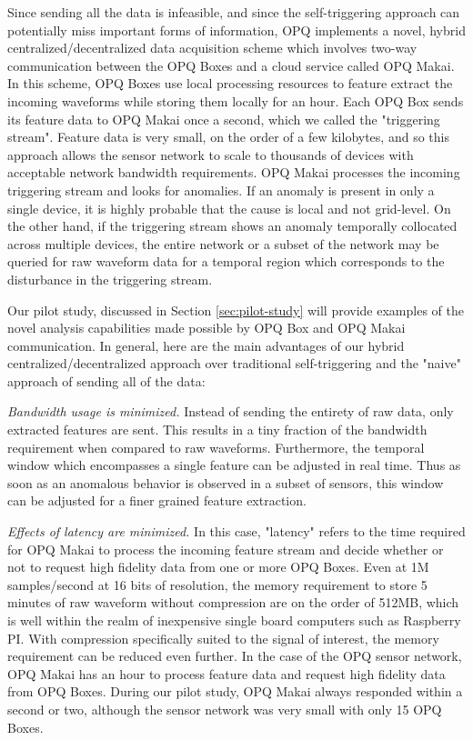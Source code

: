 Since sending all the data is infeasible, and since the self-triggering approach can potentially miss important forms of information, OPQ implements a novel, hybrid centralized/decentralized data acquisition scheme which involves two-way communication between the OPQ Boxes and a cloud service called OPQ Makai. In this scheme, OPQ Boxes use local processing resources to feature extract the incoming waveforms while storing them locally for an hour. Each OPQ Box sends its feature data to OPQ Makai once a second, which we called the "triggering stream". Feature data is very small, on the order of a few kilobytes, and so this approach allows the sensor network to scale to thousands of devices with acceptable network bandwidth requirements.  OPQ Makai processes the incoming triggering stream and looks for anomalies. If an anomaly is present in only a single device, it is highly probable that the cause is local and not grid-level. On the other hand, if the triggering stream shows an anomaly temporally collocated across multiple devices, the entire network or a subset of the network may be queried for raw waveform data for a temporal region which corresponds to the disturbance in the triggering stream.

Our pilot study, discussed in Section \ref{sec:pilot-study} will provide examples of the novel analysis capabilities made possible by OPQ Box and OPQ Makai communication. In general, here are the main advantages of our hybrid centralized/decentralized approach over traditional self-triggering and the "naive" approach of sending all of the data:

{\em Bandwidth usage is minimized.} Instead of sending the entirety of raw data, only extracted features are sent. This results in a tiny fraction of the bandwidth requirement when compared to raw waveforms. Furthermore, the temporal window which encompasses a single feature can be adjusted in real time. Thus as soon as an anomalous behavior is observed in a subset of sensors, this window can be adjusted for a finer grained feature extraction.

{\em Effects of latency are minimized.} In this case, "latency" refers to the time required for OPQ Makai to process the incoming feature stream and decide whether or not to request high fidelity data from one or more OPQ Boxes. Even at 1M samples/second at 16 bits of resolution, the memory requirement to store 5 minutes of raw waveform without compression are on the order of 512MB, which is well within the realm of inexpensive single board computers such as Raspberry PI. With compression specifically suited to the signal of interest, the memory requirement can be reduced even further. In the case of the OPQ sensor network, OPQ Makai has an hour to process feature data and request high fidelity data from OPQ Boxes. During our pilot study, OPQ Makai always responded within a second or two, although the sensor network was very small with only 15 OPQ Boxes.


